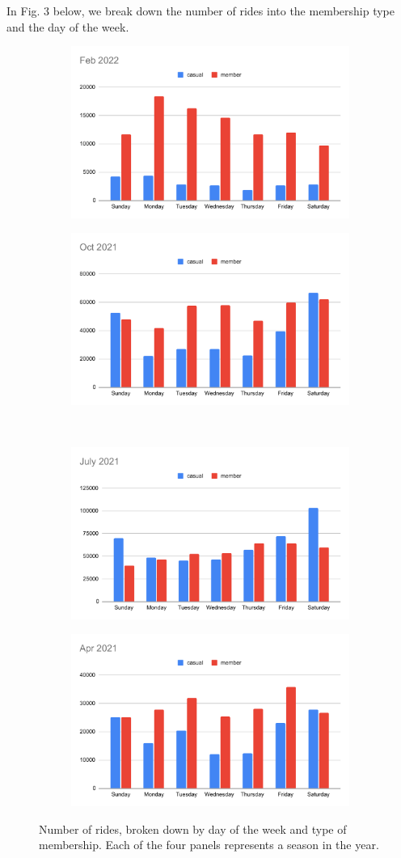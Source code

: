 \documentclass[11pt,twoside]{article}
\theoremstyle{plain}
\theoremstyle{definition}
\theoremstyle{remark}
\begin{document}
In Fig. 3 below, we break down the number of rides into the membership type and the day of the week.
\begin{center}
\begin{figure}
\begin{subfigure}{}
  \includegraphics[width=.5\linewidth]{Feb 2022}
\end{subfigure}%
\begin{subfigure}{}
  \includegraphics[width=.5\linewidth]{Oct 2021}
\end{subfigure}\\
\begin{subfigure}{}
  \includegraphics[width=.5\linewidth]{July 2021}
\end{subfigure}
\begin{subfigure}{}
  \includegraphics[width=.5\linewidth]{Apr 2021}
\end{subfigure}
\caption{Number of rides, broken down by day of the week and type of membership. Each of the four panels represents a season in the year.}
\label{fig:RideBreakdown}
\end{figure}
\end{center}
\end{document}

